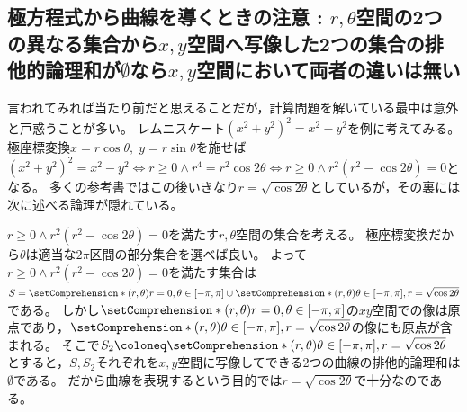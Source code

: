         \subsection{極方程式から曲線を導くときの注意 : \texorpdfstring{$r,\theta$}{r,Θ}空間の2つの異なる集合から\texorpdfstring{$x,y$}{x,y}空間へ写像した2つの集合の排他的論理和が\texorpdfstring{$\emptyset$}{∅}なら\texorpdfstring{$x,y$}{x,y}空間において両者の違いは無い}
            言われてみれば当たり前だと思えることだが，計算問題を解いている最中は意外と戸惑うことが多い。
            レムニスケート$(x^2+y^2)^2 = x^2-y^2$を例に考えてみる。
            極座標変換$x=r\cos\theta,\;y=r\sin\theta$を施せば$(x^2+y^2)^2 = x^2-y^2 \iff r\geq 0\land r^4 = r^2\cos 2\theta \iff r\geq 0\land r^2(r^2-\cos 2\theta) = 0$となる。
            多くの参考書ではこの後いきなり$r = \sqrt{\cos 2\theta}$としているが，その裏には次に述べる論理が隠れている。
            \par
            $r\geq 0\land r^2(r^2-\cos 2\theta) = 0$を満たす$r,\theta$空間の集合を考える。
            極座標変換だから$\theta$は適当な$2\pi$区間の部分集合を選べば良い。
            よって$r\geq 0\land r^2(r^2-\cos 2\theta) = 0$を満たす集合は$S = \setComprehension*{(r,\theta)}{r=0, \theta \in [-\pi,\pi]} \cup \setComprehension*{(r,\theta)}{\theta \in [-\pi,\pi], r=\sqrt{\cos 2\theta}}$である。
            しかし$\setComprehension*{(r,\theta)}{r=0, \theta \in [-\pi,\pi]}$の$xy$空間での像は原点であり，$\setComprehension*{(r,\theta)}{\theta \in [-\pi,\pi], r=\sqrt{\cos 2\theta}}$の像にも原点が含まれる。
            そこで$S_2 \coloneq \setComprehension*{(r,\theta)}{\theta \in [-\pi,\pi], r=\sqrt{\cos 2\theta}}$とすると，$S,S_2$それぞれを$x,y$空間に写像してできる2つの曲線の排他的論理和は$\emptyset$である。
            だから曲線を表現するという目的では$r = \sqrt{\cos 2\theta}$で十分なのである。